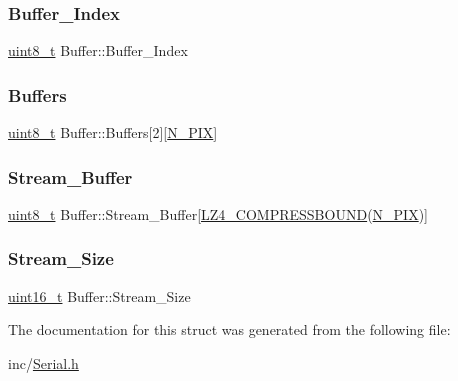 \subsubsection{\texorpdfstring{Buffer\+\_\+\+Index}{Buffer\_Index}}
{\footnotesize\ttfamily \mbox{\hyperlink{_regs_l_p_c1769_8h_aba7bc1797add20fe3efdf37ced1182c5}{uint8\+\_\+t}} Buffer\+::\+Buffer\+\_\+\+Index}

\mbox{\label{struct_buffer_aa46fd86a8467fd9c22e27aecd2ce5a6c}} 
\subsubsection{\texorpdfstring{Buffers}{Buffers}}
{\footnotesize\ttfamily \mbox{\hyperlink{_regs_l_p_c1769_8h_aba7bc1797add20fe3efdf37ced1182c5}{uint8\+\_\+t}} Buffer\+::\+Buffers\mbox{[}2\mbox{]}\mbox{[}\mbox{\hyperlink{_serial_8h_af6da69ccda8aa07b1fafe1db53bd4051}{N\+\_\+\+P\+IX}}\mbox{]}}

\mbox{\label{struct_buffer_a8f92727e7b44eade72f7770483f92e40}} 
\subsubsection{\texorpdfstring{Stream\+\_\+\+Buffer}{Stream\_Buffer}}
{\footnotesize\ttfamily \mbox{\hyperlink{_regs_l_p_c1769_8h_aba7bc1797add20fe3efdf37ced1182c5}{uint8\+\_\+t}} Buffer\+::\+Stream\+\_\+\+Buffer\mbox{[}\mbox{\hyperlink{lz4_8h_a2453a423fd34640a0afbbf57ed0a5399}{L\+Z4\+\_\+\+C\+O\+M\+P\+R\+E\+S\+S\+B\+O\+U\+ND}}(\mbox{\hyperlink{_serial_8h_af6da69ccda8aa07b1fafe1db53bd4051}{N\+\_\+\+P\+IX}})\mbox{]}}

\mbox{\label{struct_buffer_ad2ce1666d61d13e70634895da5a90696}} 
\subsubsection{\texorpdfstring{Stream\+\_\+\+Size}{Stream\_Size}}
{\footnotesize\ttfamily \mbox{\hyperlink{_regs_l_p_c1769_8h_a273cf69d639a59973b6019625df33e30}{uint16\+\_\+t}} Buffer\+::\+Stream\+\_\+\+Size}



The documentation for this struct was generated from the following file\+:\begin{DoxyCompactItemize}
\item 
inc/\mbox{\hyperlink{_serial_8h}{Serial.\+h}}\end{DoxyCompactItemize}

